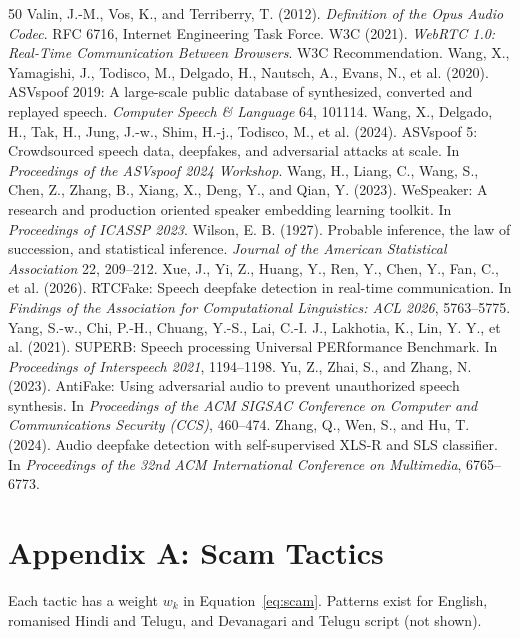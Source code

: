 \documentclass[10pt,a4paper,twocolumn]{article}
\begin{document}
\begin{thebibliography}{50}
 Valin, J.-M., Vos, K., and Terriberry, T. (2012). \emph{Definition of the Opus Audio Codec}. RFC 6716, Internet Engineering Task Force.
 W3C (2021). \emph{WebRTC 1.0: Real-Time Communication Between Browsers}. W3C Recommendation.
 Wang, X., Yamagishi, J., Todisco, M., Delgado, H., Nautsch, A., Evans, N., et al. (2020). ASVspoof 2019: A large-scale public database of synthesized, converted and replayed speech. \emph{Computer Speech \& Language} 64, 101114.
 Wang, X., Delgado, H., Tak, H., Jung, J.-w., Shim, H.-j., Todisco, M., et al. (2024). ASVspoof 5: Crowdsourced speech data, deepfakes, and adversarial attacks at scale. In \emph{Proceedings of the ASVspoof 2024 Workshop}.
 Wang, H., Liang, C., Wang, S., Chen, Z., Zhang, B., Xiang, X., Deng, Y., and Qian, Y. (2023). WeSpeaker: A research and production oriented speaker embedding learning toolkit. In \emph{Proceedings of ICASSP 2023}.
 Wilson, E. B. (1927). Probable inference, the law of succession, and statistical inference. \emph{Journal of the American Statistical Association} 22, 209--212.
 Xue, J., Yi, Z., Huang, Y., Ren, Y., Chen, Y., Fan, C., et al. (2026). RTCFake: Speech deepfake detection in real-time communication. In \emph{Findings of the Association for Computational Linguistics: ACL 2026}, 5763--5775.
 Yang, S.-w., Chi, P.-H., Chuang, Y.-S., Lai, C.-I. J., Lakhotia, K., Lin, Y. Y., et al. (2021). SUPERB: Speech processing Universal PERformance Benchmark. In \emph{Proceedings of Interspeech 2021}, 1194--1198.
 Yu, Z., Zhai, S., and Zhang, N. (2023). AntiFake: Using adversarial audio to prevent unauthorized speech synthesis. In \emph{Proceedings of the ACM SIGSAC Conference on Computer and Communications Security (CCS)}, 460--474.
 Zhang, Q., Wen, S., and Hu, T. (2024). Audio deepfake detection with self-supervised XLS-R and SLS classifier. In \emph{Proceedings of the 32nd ACM International Conference on Multimedia}, 6765--6773.
\end{thebibliography}

\appendix
\onecolumn
\section{Appendix A: Scam Tactics}
Each tactic has a weight $w_k$ in Equation~\ref{eq:scam}. Patterns exist for English, romanised Hindi and Telugu, and Devanagari and Telugu script (not shown).
\end{document}
